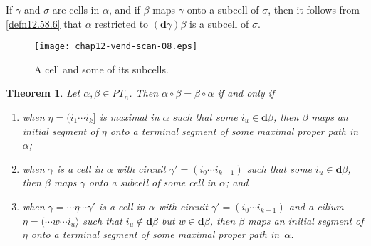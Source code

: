 \documentclass{surv-l}
\numberwithin{equation}{section}
\numberwithin{table}{section}
\numberwithin{figure}{section}
\theoremstyle{plain}
\newtheorem{theorem}[equation]{Theorem}
\theoremstyle{definition}
\begin{document}
If $\gamma$ and $\sigma$ are cells in $\alpha$, and if $\beta$
maps $\gamma$ onto a subcell of $\sigma$, then it follows from
\ref{defn12.58.6} that $\alpha$ restricted to $(\mathbf{d}\gamma)\beta$ is a
subcell of $\sigma$.


\setcounter{figure}{6}
\begin{figure}[!h]
\texttt{[image: chap12-vend-scan-08.eps]}
\caption{A cell and some of its subcells.}\label{fig12.58.7}
\end{figure}

\setcounter{equation}{7}
\begin{theorem}\label{thm12.58.8}
Let $\alpha,\beta\in PT_{n}$. Then $\alpha \circ\beta=\beta
\circ\alpha$ if and only if
\begin{enumerate}
\item[(\emph{i})] when $\eta=(i_{1}\cdots i_{k}]$ is maximal in
$\alpha$ such that some $i_{u}\in \mathbf{d}\beta$, then
$\beta$ maps an initial segment of $\eta$ onto a terminal
segment of some maximal proper path in~$\alpha$;

\item[(\emph{ii})] when $\gamma$ is a cell in $\alpha$ with circuit
$\gamma'=(i_{0}\cdots i_{k-1})$ such that some $i_{u}\in
\mathbf{d}\beta$, then $\beta$ maps $\gamma$ onto a subcell of
some cell in $\alpha$; and

\item[(\emph{ii})] when $\gamma=\cdots\eta\cdots\gamma'$ is a cell
in $\alpha$ with circuit $\gamma'=(i_{0}\cdots i_{k-1})$ and a
cilium $\eta=(\cdots w\cdots i_{u}\rangle$ such that
$i_{u}\not\in \mathbf{d}\beta$ but $w \in \mathbf{d}\beta$,
then $\beta$ maps an initial segment of $\eta$ onto a terminal
segment of some maximal proper path in~$\alpha$.
\end{enumerate}
\end{theorem}
\end{document}
